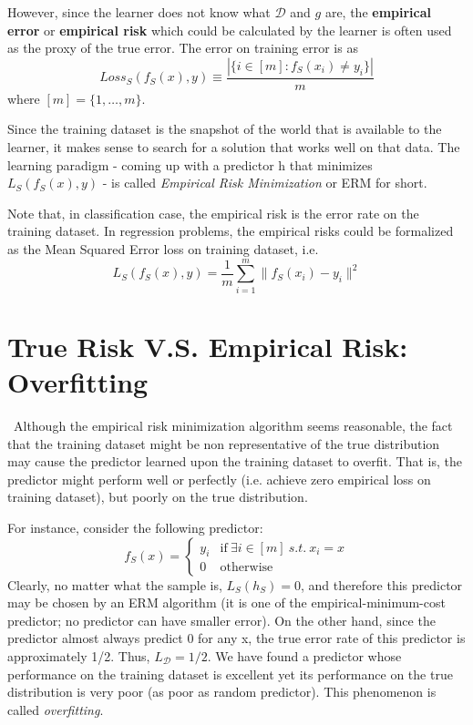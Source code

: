 \documentclass{article}[12pt]
\begin{document}
However, since the learner does not know what $\mathcal{D}$ and $g$ are, the \textbf{empirical error} or \textbf{empirical risk} which could be calculated by the learner is often used as the proxy of the true error. The error on training error is as 
\begin{equation}
    Loss_{S} (f_S(x),y)\equiv \frac{|\{i \in [m]: f_S(x_i)\neq y_i\}|}{m}
\end{equation}where $[m]=\{1,\ldots,m\}$.

Since the training dataset is the snapshot of the world that is available to the learner, it makes sense to search for a solution that works well on that data. The learning paradigm - coming up with a predictor h that minimizes $L_S(f_S(x),y)$ - is called \textit{Empirical Risk Minimization} or ERM for short.

Note that, in classification case, the empirical risk is the error rate on the training dataset. In regression problems, the empirical risks could be formalized as the Mean Squared Error loss on training dataset, i.e.
\begin{equation*}
    L_S (f_S(x),y)= \frac{1}{m} \sum_{i=1}^m \|f_S(x_i)-y_i\|^2
\end{equation*}

\section{True Risk V.S. Empirical Risk: Overfitting}
\
\indent Although the empirical risk minimization algorithm seems reasonable, the fact that the training dataset might be non representative of the true distribution may cause the predictor learned upon the training dataset to overfit. That is, the predictor might perform well or perfectly (i.e. achieve zero empirical loss on training dataset), but poorly on the true distribution. 

For instance, consider the following predictor:
\begin{equation*}
f_S(x) = 
\left\{ \begin{array}{rl}
y_i & \mbox{if} \ \exists i \in [m] \ s.t. \ x_i=x \\
0 & \mbox{otherwise}
\end{array}\right.    
\end{equation*}
Clearly, no matter what the sample is, $L_S(h_S)=0$, and therefore this predictor may be chosen by an ERM algorithm (it is one of the empirical-minimum-cost predictor; no predictor can have smaller error). On the other hand, since the predictor almost always predict 0 for any x, the true error rate of this predictor is approximately 1/2. Thus, $L_{\mathcal{D}}=1/2$. We have found a predictor whose performance on the training dataset is excellent yet its performance on the true distribution is very poor (as poor as random predictor). This phenomenon is called \textit{overfitting}.
\end{document}
